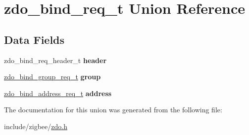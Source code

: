 \hypertarget{unionzdo__bind__req__t}{}\section{zdo\+\_\+bind\+\_\+req\+\_\+t Union Reference}
\label{unionzdo__bind__req__t}
\subsection*{Data Fields}
\begin{DoxyCompactItemize}
\item 
zdo\+\_\+bind\+\_\+req\+\_\+header\+\_\+t {\bfseries header}
\item 
\hyperlink{group__zdo_ga41ab3318ee2bd538e044d6d6e101f376}{zdo\+\_\+bind\+\_\+group\+\_\+req\+\_\+t} {\bfseries group}
\item 
\hyperlink{group__zdo_ga68c283a043714a9e40d3674146dd6239}{zdo\+\_\+bind\+\_\+address\+\_\+req\+\_\+t} {\bfseries address}
\end{DoxyCompactItemize}


The documentation for this union was generated from the following file\+:\begin{DoxyCompactItemize}
\item 
include/zigbee/\hyperlink{zdo_8h}{zdo.\+h}\end{DoxyCompactItemize}
